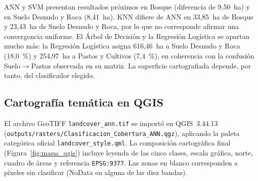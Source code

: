 \documentclass[11pt,a4paper]{article}
\begin{document}
\begin{table}[H]
\centering
\small
{}
\caption{Sensibilidad y concordancia de áreas clasificadas entre las cinco arquitecturas sobre el dominio común.}
\label{tab:sensibilidad_areas}
\end{table}

ANN y SVM presentan resultados próximos en Bosque (diferencia de 9,50~ha) y en Suelo Desnudo y Roca (8,41~ha). KNN difiere de ANN en 33,85~ha de Bosque y 23,43~ha de Suelo Desnudo y Roca, por lo que no corresponde afirmar una convergencia uniforme. El Árbol de Decisión y la Regresión Logística se apartan mucho más: la Regresión Logística asigna 616,46~ha a Suelo Desnudo y Roca (18,0~\%) y 254,97~ha a Pastos y Cultivos (7,4~\%), en coherencia con la confusión Suelo$\rightarrow$Pastos observada en su matriz. La superficie cartografiada depende, por tanto, del clasificador elegido.

\subsection{Cartografía temática en QGIS}
El archivo GeoTIFF \texttt{landcover\_ann.tif} se importó en QGIS~3.44.13 (\nolinkurl{outputs/rasters/Clasificacion_Cobertura_ANN.qgz}), aplicando la paleta categórica oficial \texttt{landcover\_style.qml}. La composición cartográfica final (Figura~\ref{fig:mapa_qgis}) incluye leyenda de las cinco clases, escala gráfica, norte, cuadro de áreas y referencia \texttt{EPSG:9377}. Las zonas en blanco corresponden a píxeles sin clasificar (NoData en alguna de las diez bandas).
\end{document}
